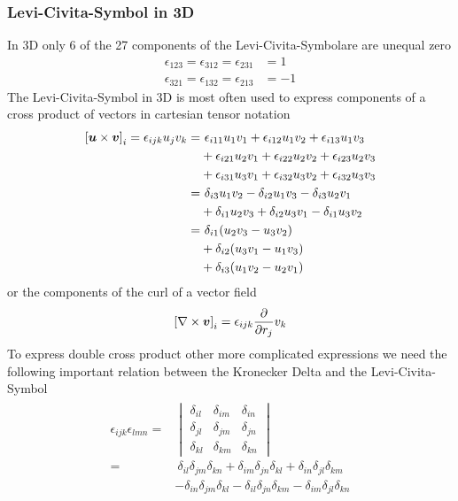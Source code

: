 \subsubsection{Levi-Civita-Symbol in 3D}
In 3D only 6 of the 27 components of the Levi-Civita-Symbolare are unequal zero
\begin{align*}
\epsilon_{123}=\epsilon_{312}=\epsilon_{231}&=1 \\
\epsilon_{321}=\epsilon_{132}=\epsilon_{213}&=-1
\end{align*}
The Levi-Civita-Symbol in 3D is most often used to express components
of a cross product of vectors in cartesian tensor notation
\begin{align*}
{ \left[ \boldsymbol{u} \times \boldsymbol{v} \right] }_i = \epsilon_{ijk} u_j v_k
=&\ \epsilon_{i11} u_1 v_1 + \epsilon_{i12} u_1 v_2 +\epsilon_{i13} u_1 v_3\\
&+\epsilon_{i21} u_2 v_1 + \epsilon_{i22} u_2 v_2 + \epsilon_{i23} u_2 v_3\\
&+\epsilon_{i31} u_3 v_1 + \epsilon_{i32} u_3 v_2 + \epsilon_{i32} u_3 v_3\\
=&\ \delta_{i3} u_1 v_2 -\delta_{i2} u_1 v_3 -\delta_{i3} u_2 v_1\\
&+\delta_{i1} u_2 v_3 + \delta_{i2} u_3 v_1 - \delta_{i1} u_3 v_2\\
=&\ \delta_{i1}{ \left( u_2 v_3-u_3 v_2 \right) }\\
&+\delta_{i2}{ \left( u_3 v_1-u_1 v_3 \right) }\\
&+\delta_{i3}{ \left( u_1 v_2-u_2 v_1 \right) }
\end{align*}
or the components of the curl of a vector field
\begin{align*}
{ \left[ \nabla \times \boldsymbol{v} \right] }_i = \epsilon_{ijk} \frac{\partial}{\partial r_j} v_k
\end{align*}
To express double cross product other more complicated expressions we need
the following important relation between the Kronecker Delta and the
Levi-Civita-Symbol 
\begin{align}
\begin{split}
\epsilon_{ijk}\epsilon_{lmn}=&
\begin{vmatrix}
  \delta_{il} & \delta_{im} & \delta_{in} \\
  \delta_{jl} & \delta_{jm} & \delta_{jn} \\
  \delta_{kl} & \delta_{km} & \delta_{kn}
\end{vmatrix}
\\
=&\ \delta_{il}\delta_{jm}\delta_{kn}
+\delta_{im}\delta_{jn}\delta_{kl}
+\delta_{in}\delta_{jl}\delta_{km}\\
&-\delta_{in}\delta_{jm}\delta_{kl}
-\delta_{il}\delta_{jn}\delta_{km}
-\delta_{im}\delta_{jl}\delta_{kn}
\end{split}
\end{align}
